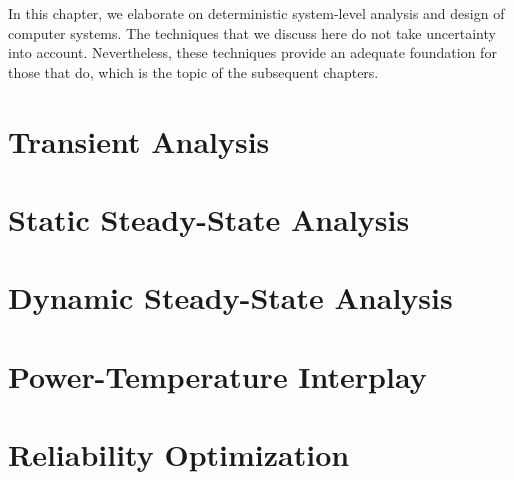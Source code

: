 In this chapter, we elaborate on deterministic system-level analysis and design
of computer systems. The techniques that we discuss here do not take uncertainty
into account. Nevertheless, these techniques provide an adequate foundation for
those that do, which is the topic of the subsequent chapters.

\section{\introductiontitle}

\section{Transient Analysis}

\section{Static Steady-State Analysis}

\section{Dynamic Steady-State Analysis}

\section{Power-Temperature Interplay}

\section{Reliability Optimization}

\section{\conclusiontitle}
